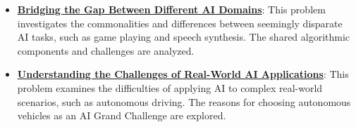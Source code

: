 \documentclass{article}%
\begin{document}
\begin{itemize}[leftmargin=*]
\item \href{https://purdue.brightspace.com/d2l/common/assets/pdfjs-d2l-dist/1.0.14-legacy/web/viewer.html?file=%2Fcontent%2Fenforced%2F1095467-wl.202510.CS.24300.001%2F02L2-Intro.pdf%3Fou%3D1095467&lang=en-us&container=d2l-fileviewer-rendered-pdf&fullscreen=d2l-fileviewer-rendered-pdf-dialog&height=667#page=31}{\textbf{Bridging the Gap Between Different AI Domains}}: This problem investigates the commonalities and differences between seemingly disparate AI tasks, such as game playing and speech synthesis. The shared algorithmic components and challenges are analyzed.%
\item \href{https://purdue.brightspace.com/d2l/common/assets/pdfjs-d2l-dist/1.0.14-legacy/web/viewer.html?file=%2Fcontent%2Fenforced%2F1095467-wl.202510.CS.24300.001%2F02L2-Intro.pdf%3Fou%3D1095467&lang=en-us&container=d2l-fileviewer-rendered-pdf&fullscreen=d2l-fileviewer-rendered-pdf-dialog&height=667#page=43}{\textbf{Understanding the Challenges of Real{-}World AI Applications}}: This problem examines the difficulties of applying AI to complex real-world scenarios, such as autonomous driving. The reasons for choosing autonomous vehicles as an AI Grand Challenge are explored.%
\end{itemize}%
\end{document}
